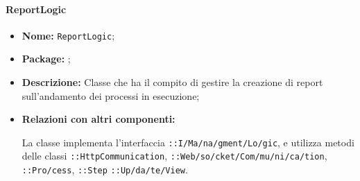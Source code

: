 \paragraph{ReportLogic}
\begin{flushleft}
\begin{itemize}
\item \textbf{Nome:} \texttt{ReportLogic};
\item \textbf{Package:} \texttt{\logicUser{}};
\item \textbf{Descrizione:} Classe che ha il compito di gestire la creazione di report sull'andamento dei processi in esecuzione;
\item \textbf{Relazioni con altri componenti:}
\begin{sloppypar}
La classe implementa l'interfaccia \texttt{\iLogicUser{}::I\fshyp{}Ma\fshyp{}na\fshyp{}gment\fshyp{}Lo\fshyp{}gic}, e utilizza metodi delle classi \texttt{\serverCommunication{}::HttpCommunication}, \texttt{\serverCommunication{}::Web\fshyp{}so\fshyp{}cket\fshyp{}Com\fshyp{}mu\fshyp{}ni\fshyp{}ca\fshyp{}tion}, \texttt{\modelUser{}::Pro\fshyp{}cess}, \texttt{\model{}::Step} \texttt{\logicUser{}::Up\fshyp{}da\fshyp{}te\fshyp{}View}.
\end{sloppypar}
\end{itemize}
\end{flushleft}
